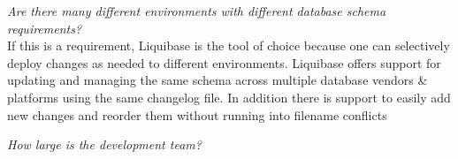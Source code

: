 \textit{Are there many different environments with different database schema requirements?}\\
If this is a requirement, Liquibase is the tool of choice because one can selectively deploy changes as needed to different environments. 
Liquibase offers support for updating and managing the same schema across multiple database vendors \& platforms using the same changelog file.
In addition there is support to easily add new changes and reorder them without running into filename conflicts

\textit{How large is the development team?}\\


\newpage
